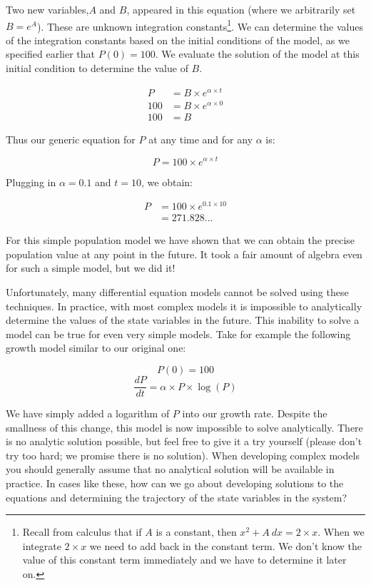 \documentclass[]{memoir}
\begin{document}
Two new variables,$A$ and $B$, appeared in this equation (where we
arbitrarily set $B=e^A$). These are unknown integration
constants\footnote{Recall from calculus that if $A$ is a constant, then
  $x^2+A\ dx = 2 \times x$. When we integrate $2 \times x$ we need to
  add back in the constant term. We don't know the value of this
  constant term immediately and we have to determine it later on.}. We
can determine the values of the integration constants based on the
initial conditions of the model, as we specified earlier that
$P(0) = 100$. We evaluate the solution of the model at this initial
condition to determine the value of $B$.

\[
\begin{aligned}
P &= B \times e^{\alpha \times t} \\
100 &= B \times e^{\alpha \times 0} \\
100 &= B
\end{aligned}
\]

Thus our generic equation for $P$ at any time and for any $\alpha$ is:

\[ P = 100 \times e^{\alpha \times t} \]

Plugging in $\alpha=0.1$ and $t=10$, we obtain:

\[
\begin{aligned}
P &= 100 \times e^{0.1 \times 10} \\
  &= 271.828...
\end{aligned}
\]

For this simple population model we have shown that we can obtain the
precise population value at any point in the future. It took a fair
amount of algebra even for such a simple model, but we did it!

Unfortunately, many differential equation models cannot be solved using
these techniques. In practice, with most complex models it is impossible
to analytically determine the values of the state variables in the
future. This inability to solve a model can be true for even very simple
models. Take for example the following growth model similar to our
original one:

\[ P(0) = 100 \] \[ \frac{dP}{dt} = \alpha \times P \times \log(P) \]

We have simply added a logarithm of $P$ into our growth rate. Despite
the smallness of this change, this model is now impossible to solve
analytically. There is no analytic solution possible, but feel free to
give it a try yourself (please don't try too hard; we promise there is
no solution). When developing complex models you should generally assume
that no analytical solution will be available in practice. In cases like
these, how can we go about developing solutions to the equations and
determining the trajectory of the state variables in the system?
\end{document}
